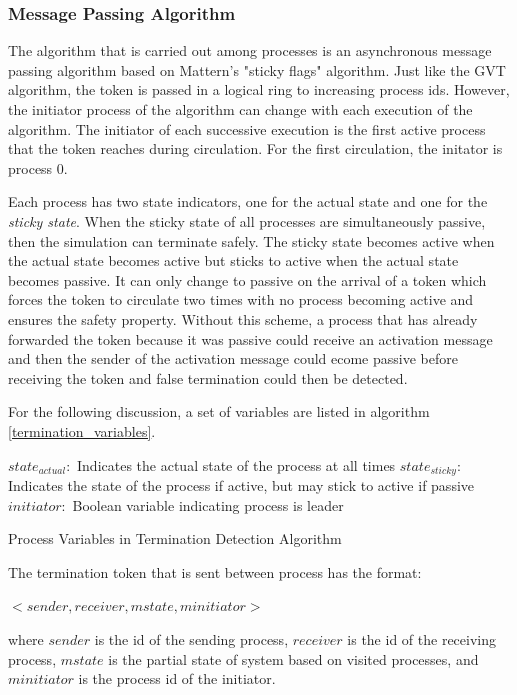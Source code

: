 \documentclass[11pt]{book}
\begin{document}
\subsubsection{Message Passing Algorithm}

The algorithm that is carried out among processes is an asynchronous message passing
algorithm based on Mattern's "sticky flags" algorithm\cite{mattern-93}. Just like the GVT
algorithm, the token is passed in a logical ring to increasing process ids. However, the
initiator process of the algorithm can change with each execution of the algorithm. The initiator
of each successive execution is the first active process that the token reaches during circulation.
For the first circulation, the initator is process 0.

Each process has two state indicators, one for the actual state and one for the \emph{sticky state}.
When the sticky state of all processes are simultaneously passive, then the simulation can terminate
safely. The sticky state becomes active when the actual state becomes active but sticks to active
when the actual state becomes passive. It can only change to passive on the arrival of a token which
forces the token to circulate two times with no process becoming active and ensures the safety
property. Without this scheme, a process that has already forwarded the token because it was
passive could receive an activation message and then the sender of the activation message could 
ecome passive before receiving the token and false termination could then be detected.

For the following discussion, a set of variables are listed in algorithm \ref{termination_variables}.

\begin{algorithm}
\DontPrintSemicolon
    \boldmath$state_{actual}:$ Indicates the actual state of the process at all times\;
    \boldmath$state_{sticky}:$ Indicates the state of the process if active, but may stick
        to active if passive\;
    \boldmath$initiator:$ Boolean variable indicating process is leader\;
\caption{Process Variables in Termination Detection Algorithm}\label{termination_variables}
\end{algorithm}

\noindent
The termination token that is sent between process has the format:

    $<sender, receiver, mstate, minitiator>$

\noindent
where $sender$ is the id of the sending process, $receiver$ is the id of the receiving
process, $mstate$ is the partial state of system based on visited processes, and $minitiator$
is the process id of the initiator.
\end{document}
